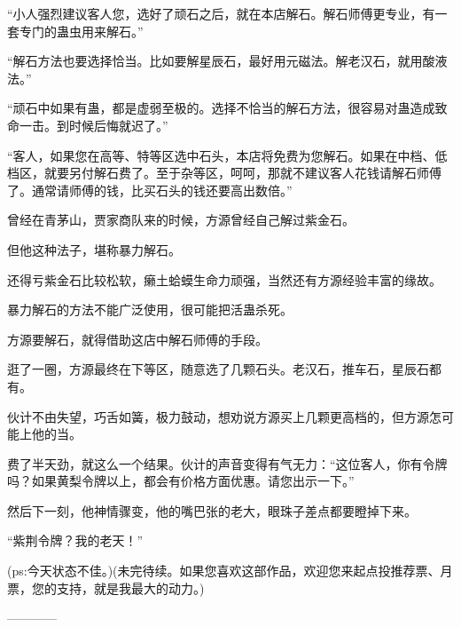 \begin{this_body}
“小人强烈建议客人您，选好了顽石之后，就在本店解石。解石师傅更专业，有一套专门的蛊虫用来解石。”

“解石方法也要选择恰当。比如要解星辰石，最好用元磁法。解老汉石，就用酸液法。”

“顽石中如果有蛊，都是虚弱至极的。选择不恰当的解石方法，很容易对蛊造成致命一击。到时候后悔就迟了。”

“客人，如果您在高等、特等区选中石头，本店将免费为您解石。如果在中档、低档区，就要另付解石费了。至于杂等区，呵呵，那就不建议客人花钱请解石师傅了。通常请师傅的钱，比买石头的钱还要高出数倍。”

曾经在青茅山，贾家商队来的时候，方源曾经自己解过紫金石。

但他这种法子，堪称暴力解石。

还得亏紫金石比较松软，癞土蛤蟆生命力顽强，当然还有方源经验丰富的缘故。

暴力解石的方法不能广泛使用，很可能把活蛊杀死。

方源要解石，就得借助这店中解石师傅的手段。

逛了一圈，方源最终在下等区，随意选了几颗石头。老汉石，推车石，星辰石都有。

伙计不由失望，巧舌如簧，极力鼓动，想劝说方源买上几颗更高档的，但方源怎可能上他的当。

费了半天劲，就这么一个结果。伙计的声音变得有气无力：“这位客人，你有令牌吗？如果黄梨令牌以上，都会有价格方面优惠。请您出示一下。”

然后下一刻，他神情骤变，他的嘴巴张的老大，眼珠子差点都要瞪掉下来。

“紫荆令牌？我的老天！”

(ps:今天状态不佳。)(未完待续。如果您喜欢这部作品，欢迎您来起点投推荐票、月票，您的支持，就是我最大的动力。)

------------

\end{this_body}

